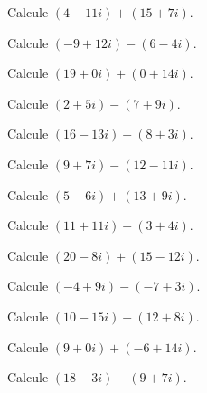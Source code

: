 \begin{ejercicio}
Calcule $(4-11i) + (15+7i)$.
\end{ejercicio}

\begin{ejercicio}
Calcule $(-9+12i) - (6-4i)$.
\end{ejercicio}

\begin{ejercicio}
Calcule $(19+0i) + (0+14i)$.
\end{ejercicio}

\begin{ejercicio}
Calcule $(2+5i) - (7+9i)$.
\end{ejercicio}

\begin{ejercicio}
Calcule $(16-13i) + (8+3i)$.
\end{ejercicio}

\begin{ejercicio}
Calcule $(9+7i) - (12-11i)$.
\end{ejercicio}

\begin{ejercicio}
Calcule $(5-6i) + (13+9i)$.
\end{ejercicio}

\begin{ejercicio}
Calcule $(11+11i) - (3+4i)$.
\end{ejercicio}

\begin{ejercicio}
Calcule $(20-8i) + (15-12i)$.
\end{ejercicio}

\begin{ejercicio}
Calcule $(-4+9i) - (-7+3i)$.
\end{ejercicio}

\begin{ejercicio}
Calcule $(10-15i) + (12+8i)$.
\end{ejercicio}

\begin{ejercicio}
Calcule $(9+0i) + (-6+14i)$.
\end{ejercicio}

\begin{ejercicio}
Calcule $(18-3i) - (9+7i)$.
\end{ejercicio}

